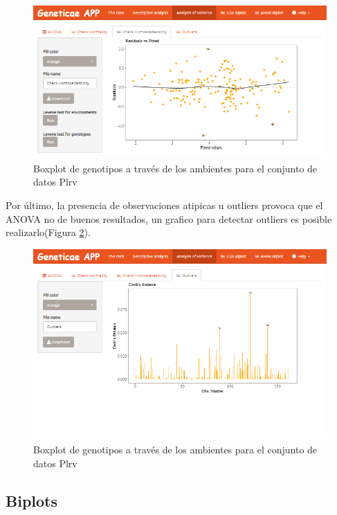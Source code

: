 \begin{figure}[H]
	\begin{center}
		\includegraphics[width=14cm]{./Graficos/Homocedasticidad.png}
	\end{center}
	\caption{Boxplot de genotipos a través de los ambientes para el conjunto de datos Plrv}
	\label{fig:fig49}
\end{figure}

Por último, la presencia de observaciones atipicas u outliers provoca que el ANOVA no de buenos resultados, un grafico para detectar outliers es posible realizarlo(Figura \ref{fig:fig49}).

\begin{figure}[H]
	\begin{center}
		\includegraphics[width=14cm]{./Graficos/Outliers.png}
	\end{center}
	\caption{Boxplot de genotipos a través de los ambientes para el conjunto de datos Plrv}
	\label{fig:fig49}
\end{figure}

\subsection{Biplots}

